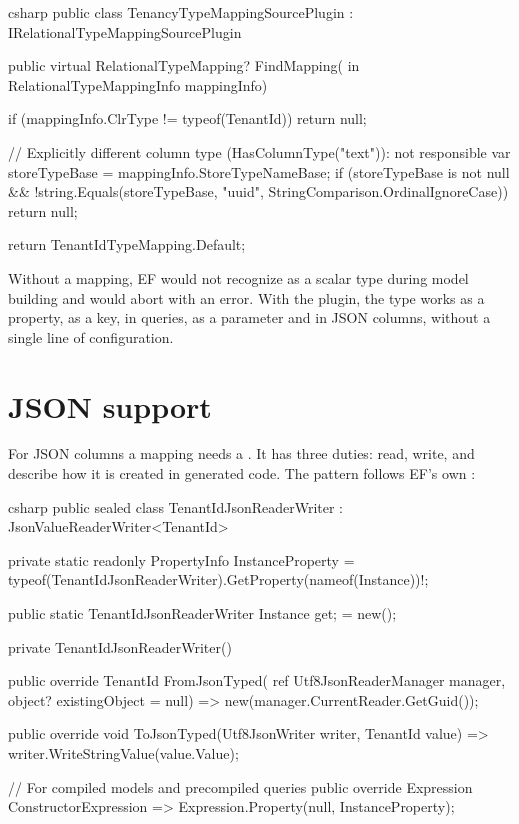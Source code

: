\begin{sourcecode}{csharp}
public class TenancyTypeMappingSourcePlugin : IRelationalTypeMappingSourcePlugin
{
    public virtual RelationalTypeMapping? FindMapping(
        in RelationalTypeMappingInfo mappingInfo)
    {
        if (mappingInfo.ClrType != typeof(TenantId))
            return null;

        // Explicitly different column type (HasColumnType("text")): not responsible
        var storeTypeBase = mappingInfo.StoreTypeNameBase;
        if (storeTypeBase is not null
            && !string.Equals(storeTypeBase, "uuid", StringComparison.OrdinalIgnoreCase))
            return null;

        return TenantIdTypeMapping.Default;
    }
}
\end{sourcecode}

\begin{note}
  Without a mapping, EF would not recognize  as a scalar type
  during model building and would abort with an error. With the plugin, the type works as a
  property, as a key, in queries, as a parameter and in JSON columns, without a single line
  of configuration.
\end{note}

\section{JSON support}

For JSON columns a mapping needs a
. It has three duties:
read, write, and describe how it is created in generated code. The pattern follows EF's own
:

\begin{sourcecode}{csharp}
public sealed class TenantIdJsonReaderWriter : JsonValueReaderWriter<TenantId>
{
    private static readonly PropertyInfo InstanceProperty =
        typeof(TenantIdJsonReaderWriter).GetProperty(nameof(Instance))!;

    public static TenantIdJsonReaderWriter Instance { get; } = new();

    private TenantIdJsonReaderWriter()
    {
    }

    public override TenantId FromJsonTyped(
        ref Utf8JsonReaderManager manager, object? existingObject = null)
        => new(manager.CurrentReader.GetGuid());

    public override void ToJsonTyped(Utf8JsonWriter writer, TenantId value)
        => writer.WriteStringValue(value.Value);

    // For compiled models and precompiled queries
    public override Expression ConstructorExpression
        => Expression.Property(null, InstanceProperty);
}
\end{sourcecode}

